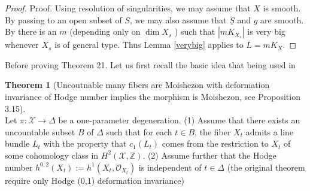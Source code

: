 \documentclass[11pt]{article}
\theoremstyle{definition}
\newtheorem{theorem}{Theorem}[section]
\begin{document}
	\begin{proof}
		Proof. Using resolution of singularities, we may assume that $X$ is smooth. By passing to an open subset of $S$, we may also assume that $\underline{S}$ and $g$ are smooth. By \cite{HaconMckernan} there is an $m$ (depending only on $\operatorname{dim} X_s$ ) such that $\left|m K_{X_s}\right|$ is very big whenever $X_s$ is of general type. Thus Lemma \ref{verybig} applies to $L=m K_X$.
	\end{proof}
	
	Before proving Theorem 21. Let us first recall the basic idea that being used in \cite{RaoTsai}
	\begin{theorem}[Uncoutnable many fibers are Moishezon with deformation invariance of Hodge number implies the morphism is Moishezon, see \cite{RaoTsai} Proposition 3.15]~\\
		
	    Let $\pi: \mathcal{X} \rightarrow \Delta$ be a one-parameter degeneration. 
		(1) Assume that there exists an uncountable subset $B$ of $\Delta$ such that for each $t \in B$, the fiber $X_t$ admits a line bundle $L_t$ with the property that $c_1\left(L_t\right)$ comes from the restriction to $X_t$ of some cohomology class in $H^2(\mathcal{X}, \mathbb{Z})$.
		(2) Assume further that the Hodge number $h^{0,2}\left(X_t\right):=h^1\left(X_t, \mathcal{O}_{X_t}\right)$ is independent of $t \in \Delta$ (the original theorem require only Hodge (0,1) deformation invariance)
	\end{theorem}
\end{document}
